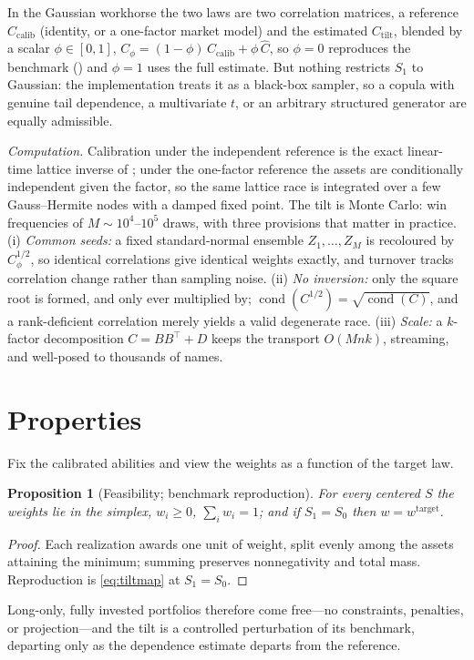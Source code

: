 \documentclass[11pt]{article}
\newtheorem{proposition}{Proposition}
\begin{document}
In the Gaussian workhorse the two laws are two correlation matrices, a
reference $C_{\mathrm{calib}}$ (identity, or a one-factor market model) and
the estimated $C_{\mathrm{tilt}}$, blended by a scalar $\phi \in [0,1]$,
$C_\phi = (1-\phi)\,C_{\mathrm{calib}} + \phi\,\widehat C$, so $\phi = 0$
reproduces the benchmark () and $\phi = 1$ uses the full
estimate. But nothing restricts $S_1$ to Gaussian: the implementation treats it
as a black-box sampler, so a copula with genuine tail dependence, a
multivariate $t$, or an arbitrary structured generator are equally admissible.

\emph{Computation.} Calibration under the independent reference is the exact
linear-time lattice inverse of \textcite{cotton2021}; under the one-factor
reference the assets are conditionally independent given the factor, so the
same lattice race is integrated over a few Gauss--Hermite nodes with a damped
fixed point. The tilt is Monte Carlo: win frequencies of $M \sim 10^4$--$10^5$
draws, with three provisions that matter in practice. (i) \emph{Common seeds:}
a fixed standard-normal ensemble $Z_1,\dots,Z_M$ is recoloured by
$C_\phi^{1/2}$, so identical correlations give identical weights exactly, and
turnover tracks correlation change rather than sampling noise. (ii) \emph{No
inversion:} only the square root is formed, and only ever multiplied by;
$\operatorname{cond}(C^{1/2}) = \sqrt{\operatorname{cond}(C)}$, and a
rank-deficient correlation merely yields a valid degenerate race. (iii)
\emph{Scale:} a $k$-factor decomposition $C = BB^\top + D$ keeps the transport
$O(Mnk)$, streaming, and well-posed to thousands of names.

\section{Properties}
\label{sec:properties}

Fix the calibrated abilities and view the weights as a function of the target
law.

\begin{proposition}[Feasibility; benchmark reproduction]
\label{prop:fixedpoint}
For every centered $S$ the weights lie in the simplex, $w_i \ge 0$,
$\sum_i w_i = 1$; and if $S_1 = S_0$ then $w = w^{\mathrm{target}}$.
\end{proposition}
\begin{proof}
Each realization awards one unit of weight, split evenly among the assets
attaining the minimum; summing preserves nonnegativity and total mass.
Reproduction is \eqref{eq:tiltmap} at $S_1 = S_0$.
\end{proof}
Long-only, fully invested portfolios therefore come free---no constraints,
penalties, or projection---and the tilt is a controlled perturbation of its
benchmark, departing only as the dependence estimate departs from the
reference.
\end{document}
